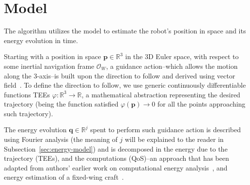 \documentclass[letterpaper,10pt,conference]{ieeeconf}
\begin{document}



\section{Model}
\label{sec:estimation}

The algorithm utilizes the model to estimate the robot's position in space and its energy evolution in time.

Starting with a position in space $\mathbf{p}\in\mathbb{R}^3$ in the 3D Euler space, with respect to some inertial navigation frame $\mathcal{O}_W$, a guidance action--which allows the motion along the 3-axis--is built upon the direction to follow and derived using vector field~\cite{de2017guidance}. To define the direction to follow, we use generic continuously differentiable functions TEEs $\varphi:\mathbb{R}^3\rightarrow\mathbb{R}$, a mathematical abstraction representing the desired trajectory (being the function satisfied $\varphi(\mathbf{p})\rightarrow 0$ for all the points approaching such trajectory).

The energy evolution $\mathbf{q}\in\mathbb{R}^j$ spent to perform such guidance action is described using Fourier analysis (the meaning of $j$ will be explained to the reader in Subsection~\ref{sec:energy-model}) and is decomposed in the energy due to the trajectory (TEEs), and the computations (QoS)--an approach that has been adapted from authors' earlier work on computational energy analysis~\cite{seewald2019coarse, seewald2019component}, and energy estimation of a fixed-wing craft~\cite{seewald2020mechanical}.
\end{document}
